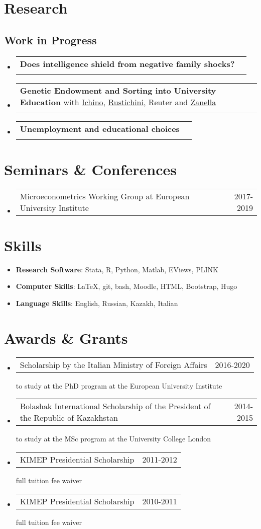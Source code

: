 \documentclass[a4, 11pt]{article}
\makeatletter
\newcommand{\resumePublicationHeading}[3]{
        \item
        \begin{tabularx}{0.97\textwidth}{X@{\extracolsep{2em}}r}
          #1 & #2 \\
          \multicolumn{2}{l}{\textit{\small#3}}
        \end{tabularx}
    }
\newcommand{\resumeOtherHeading}[2]{
      \item
      \begin{tabularx}{0.97\textwidth}{X@{\extracolsep{2em}}r}
        #1 & #2
      \end{tabularx}
    }
\newcommand{\resumeSubHeadingListStart}{\begin{itemize}[leftmargin=0.15in, label={}]}
\newcommand{\resumeSubHeadingListEnd}{\end{itemize}}
\makeatother
\begin{document}
    \section*{Research}\subsection{Work in Progress}
        \resumeSubHeadingListStart    \resumePublicationHeading
      { \textbf{Does intelligence shield from negative family shocks?} }
      {}
      {}    \resumePublicationHeading
      { \textbf{Genetic Endowment and Sorting into University Education} with \href{http://www.andreaichino.it}{Ichino},
      \href{https://sites.google.com/site/aldorustichini/}{Rustichini},
      Reuter and 
      \href{https://sites.google.com/site/giuliozanella/}{Zanella} }
      {}
      {}    \resumePublicationHeading
      { \textbf{Unemployment and educational choices} }
      {}
      {}\resumeSubHeadingListEnd


    \section*{Seminars \& Conferences}
  \resumeSubHeadingListStart
        \resumeOtherHeading
          {{Microeconometrics Working Group} at {European University Institute} }
          { 2017-2019 }
    \resumeSubHeadingListEnd


    \section{Skills}\begin{itemize}[leftmargin=0.15in, label = {}]
      \item \small{ \textbf{Research Software}: Stata, R, Python, Matlab, EViews, PLINK}
      \item \small{ \textbf{Computer Skills}: LaTeX, git, bash, Moodle, HTML, Bootstrap, Hugo}
      \item \small{ \textbf{Language Skills}: English, Russian, Kazakh, Italian}
  \end{itemize}


    \section{Awards \& Grants}
  \resumeSubHeadingListStart
        \resumeOtherHeading
          {  {Scholarship by the Italian Ministry of Foreign Affairs}{} }
          { 2016-2020 }
          {to study at the PhD program at the European University Institute}
        \resumeOtherHeading
          {  {Bolashak International Scholarship of the President of the Republic of Kazakhstan}{} }
          { 2014-2015 }
          {to study at the MSc program at the University College London}
        \resumeOtherHeading
          {  {KIMEP Presidential Scholarship}{} }
          { 2011-2012 }
          {full tuition fee waiver}
        \resumeOtherHeading
          {  {KIMEP Presidential Scholarship}{} }
          { 2010-2011 }
          {full tuition fee waiver}
    \resumeSubHeadingListEnd

    
\end{document}

